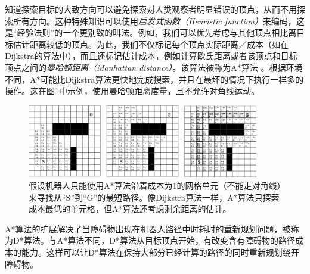 知道探索目标的大致方向可以避免探索对人类观察者明显错误的顶点，从而不用探索所有方向。这种特殊知识可以使用\emph{启发式函数（Heuristic function）}来编码，这是“经验法则”的一个更别致的叫法。例如，我们可以优先考虑与其他顶点相比离目标估计距离较低的顶点。为此，我们不仅标记每个顶点实际距离／成本（如在Dijkstra的算法中），而且还标记估计成本，例如计算欧氏距离或者该顶点和目标顶点之间的\emph{曼哈顿距离（Manhattan distance）}。该算法被称为A*算法 \cite{hart1968formal}。根据环境不同，A*可能比Dijkstra算法更快地完成搜索，并且在最坏的情况下执行一样多的操作。这在图\ref{fig:astargrid}中示例，使用曼哈顿距离度量，且不允许对角线运动。


\begin{figure}[htb]
\centering
\includegraphics[width=0.9\textwidth]{figs/astargrid}
\caption{假设机器人只能使用A*算法沿着成本为1的网格单元（不能走对角线）来寻找从“S”到“G”的最短路径。像Dijkstra算法一样，A*算法只探索成本最低的单元格，但A*算法还考虑剩余距离的估计。}
\label{fig:astargrid}
\end{figure}


A*算法的扩展解决了当障碍物出现在机器人路径中时耗时的重新规划问题，被称为D*算法\cite{stentz1994optimal}。与A*算法不同，D*算法从目标顶点开始，有改变含有障碍物的路径成本的能力。这样可以让D*算法在保持大部分已经计算的路径的同时重新规划绕开障碍物。

